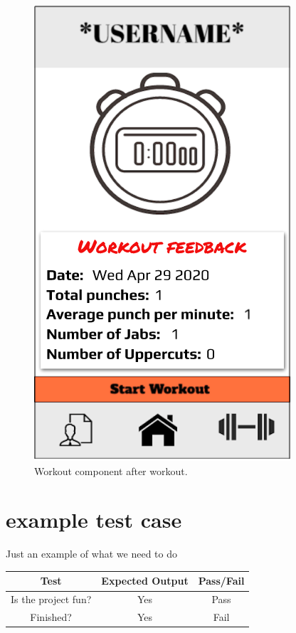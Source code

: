 \documentclass[a4paper,12pt]{report}
\begin{document}
    \begin{figure}[h]
        \begin{center}
        \includegraphics[scale=.47]{images/afterWorkout.png}
        \caption{Workout component after workout.}
        \label{fig:aWComponent}
        \end{center}
    \end{figure}

\chapter{example test case}
Just an example of what we need to do
\begin{center}
 \begin{tabular}{||c c c||} 
 \hline
 Test & Expected Output & Pass/Fail \\ [0.5ex] 
 \hline\hline
 Is the project fun? & Yes & Pass \\ 
 \hline
 \hline
 Finished? & Yes & Fail \\ [1ex] 
 \hline
\end{tabular}
\end{center}
\end{document}
